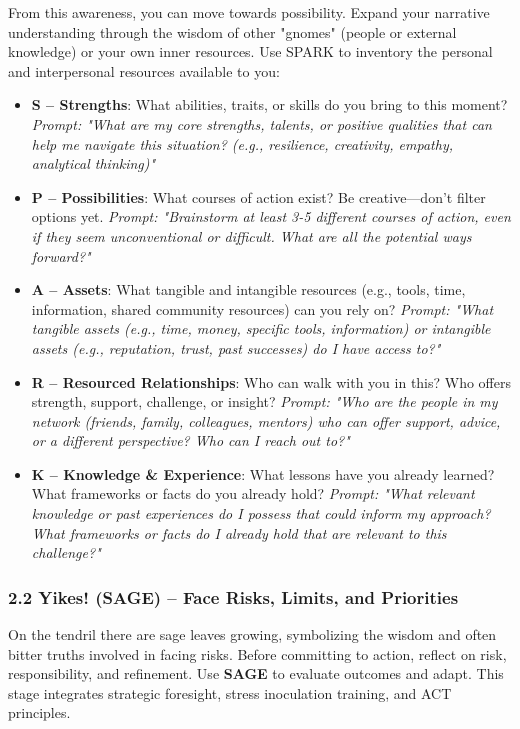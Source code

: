 \documentclass{article}
\begin{document}
\begin{center}
\end{center}

From this awareness, you can move towards possibility. Expand your narrative understanding through the wisdom of other "gnomes" (people or external knowledge) or your own inner resources. Use SPARK to inventory the personal and interpersonal resources available to you:
\begin{itemize}[noitemsep,topsep=0pt]
    \item \textbf{S – Strengths}: What abilities, traits, or skills do you bring to this moment? \textit{Prompt: "What are my core strengths, talents, or positive qualities that can help me navigate this situation? (e.g., resilience, creativity, empathy, analytical thinking)"}
    \item \textbf{P – Possibilities}: What courses of action exist? Be creative—don't filter options yet. \textit{Prompt: "Brainstorm at least 3-5 different courses of action, even if they seem unconventional or difficult. What are all the potential ways forward?"}
    \item \textbf{A – Assets}: What tangible and intangible resources (e.g., tools, time, information, shared community resources) can you rely on? \textit{Prompt: "What tangible assets (e.g., time, money, specific tools, information) or intangible assets (e.g., reputation, trust, past successes) do I have access to?"}
    \item \textbf{R – Resourced Relationships}: Who can walk with you in this? Who offers strength, support, challenge, or insight? \textit{Prompt: "Who are the people in my network (friends, family, colleagues, mentors) who can offer support, advice, or a different perspective? Who can I reach out to?"}
    \item \textbf{K – Knowledge \& Experience}: What lessons have you already learned? What frameworks or facts do you already hold? \textit{Prompt: "What relevant knowledge or past experiences do I possess that could inform my approach? What frameworks or facts do I already hold that are relevant to this challenge?"}
\end{itemize}

\subsubsection{2.2 Yikes! (SAGE) – Face Risks, Limits, and Priorities}
On the tendril there are sage leaves growing, symbolizing the wisdom and often bitter truths involved in facing risks. Before committing to action, reflect on risk, responsibility, and refinement. Use \textbf{SAGE} to evaluate outcomes and adapt. This stage integrates strategic foresight, stress inoculation training, and ACT principles.
\end{document}
